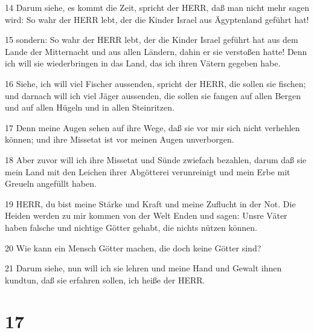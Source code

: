 \par 14 Darum siehe, es kommt die Zeit, spricht der HERR, daß man nicht mehr sagen wird: So wahr der HERR lebt, der die Kinder Israel aus Ägyptenland geführt hat!
\par 15 sondern: So wahr der HERR lebt, der die Kinder Israel geführt hat aus dem Lande der Mitternacht und aus allen Ländern, dahin er sie verstoßen hatte! Denn ich will sie wiederbringen in das Land, das ich ihren Vätern gegeben habe.
\par 16 Siehe, ich will viel Fischer aussenden, spricht der HERR, die sollen sie fischen; und darnach will ich viel Jäger aussenden, die sollen sie fangen auf allen Bergen und auf allen Hügeln und in allen Steinritzen.
\par 17 Denn meine Augen sehen auf ihre Wege, daß sie vor mir sich nicht verhehlen können; und ihre Missetat ist vor meinen Augen unverborgen.
\par 18 Aber zuvor will ich ihre Missetat und Sünde zwiefach bezahlen, darum daß sie mein Land mit den Leichen ihrer Abgötterei verunreinigt und mein Erbe mit Greueln angefüllt haben.
\par 19 HERR, du bist meine Stärke und Kraft und meine Zuflucht in der Not. Die Heiden werden zu mir kommen von der Welt Enden und sagen: Unsre Väter haben falsche und nichtige Götter gehabt, die nichts nützen können.
\par 20 Wie kann ein Mensch Götter machen, die doch keine Götter sind?
\par 21 Darum siehe, nun will ich sie lehren und meine Hand und Gewalt ihnen kundtun, daß sie erfahren sollen, ich heiße der HERR.

\chapter{17}

